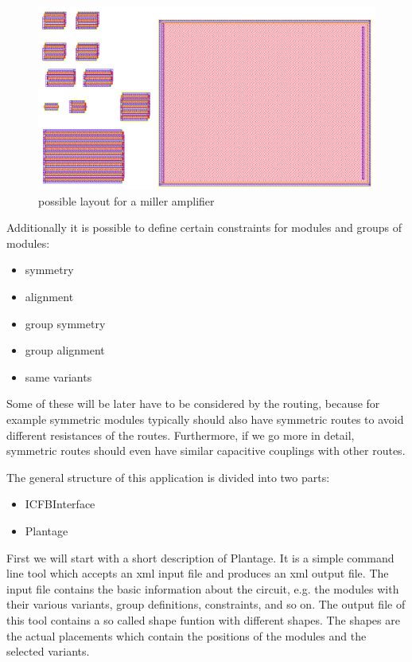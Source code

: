 \begin{figure}
	\centering
	\includegraphics[scale=0.4]{FIG/miller_amplifier_layout.png}
	\caption{possible layout for a miller amplifier}
	\label{fig:miller_amplifier_layout}
\end{figure}

Additionally it is possible to define certain constraints for modules and groups of modules:
\begin{itemize}
\item symmetry
\item alignment
\item group symmetry
\item group alignment
\item same variants
\end{itemize}

Some of these will be later have to be considered by the routing, because for example symmetric modules typically should also have symmetric routes to avoid different resistances of the routes. Furthermore, if we go more in detail, symmetric routes should even have similar capacitive couplings with other routes.

The general structure of this application is divided into two parts:
\begin{itemize}
\item ICFBInterface
\item Plantage
\end{itemize}

First we will start with a short description of Plantage. It is a simple command line tool which accepts an xml input file and produces an xml output file. The input file contains the basic information about the circuit, e.g. the modules with their various variants, group definitions, constraints, and so on. The output file of this tool contains a so called shape funtion with different shapes. The shapes are the actual placements which contain the positions of the modules and the selected variants.

